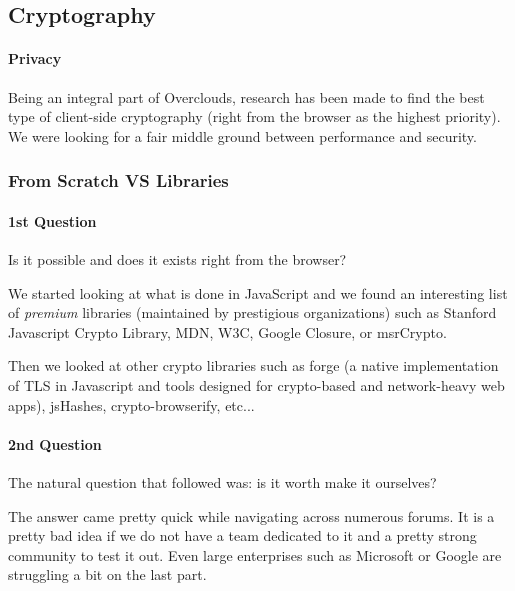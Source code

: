 
\subsection{Cryptography}
\paragraph{Privacy} Being an integral part of Overclouds, research has been made to find the best type of client-side cryptography (right from the browser as the highest priority). We were looking for a fair middle ground between performance and security.

\subsubsection{From Scratch VS Libraries}
\paragraph{1st Question} Is it possible and does it exists right from the browser?

We started looking at what is done in JavaScript and we found an interesting list of \textit{premium} libraries (maintained by prestigious organizations) such as Stanford Javascript Crypto Library\cite{Stark2009SymmetricJavascript}, MDN\cite{MDN2015MDNCrypto}, W3C\cite{Sleevi2014WebAPI}, Google Closure\cite{Google2015ClosureLibrary}, or msrCrypto\cite{Microsoft2015MSRLibrary}.

Then we looked at other crypto libraries such as forge\cite{DigitalBazaar2016Forge} (a native implementation of TLS in Javascript and tools designed for crypto-based and network-heavy web apps), jsHashes\cite{Johnston2015JsHashes}, crypto-browserify\cite{Tarr2013Crypto-Browserify}, etc...

\paragraph{2nd Question} The natural question that followed was: is it worth make it ourselves?

The answer came pretty quick while navigating across numerous forums. It is a pretty bad idea if we do not have a team dedicated to it and a pretty strong community to test it out. Even large enterprises such as Microsoft or Google are struggling a bit on the last part.

